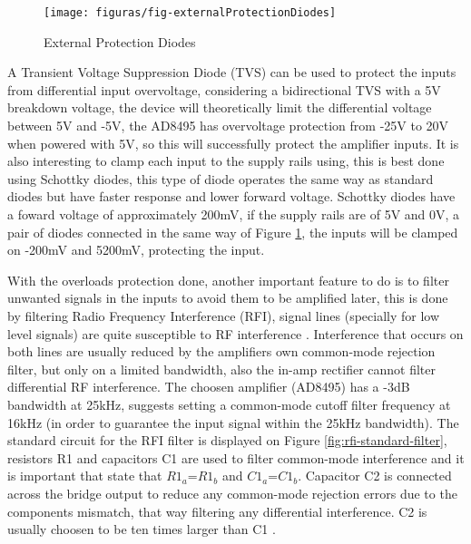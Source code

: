 		\begin{figure}[htbp]
			\centering
				\texttt{[image: figuras/fig-externalProtectionDiodes]}
			\caption{External Protection Diodes \cite{externalProtectionDiodes}}
			\label{fig:externalProtectionDiodes}
		\end{figure}
		
	A Transient Voltage Suppression Diode (TVS) can be used to protect the inputs from differential input overvoltage, considering a bidirectional TVS with a 5V breakdown voltage, the device will theoretically limit the differential voltage between 5V and -5V, the AD8495 has overvoltage protection from -25V to 20V when powered with 5V, so this will successfully protect the amplifier inputs. It is also interesting to clamp each input to the supply rails using, this is best done using Schottky diodes, this type of diode operates the same way as standard diodes but have faster response and lower forward voltage. Schottky diodes have a foward voltage of approximately 200mV, if the supply rails are of 5V and 0V, a pair of diodes connected in the same way of Figure \ref{fig:externalProtectionDiodes}, the inputs will be clamped on -200mV and 5200mV, protecting the input.
	\par
	With the overloads protection done, another important feature to do is to filter unwanted signals in the inputs to avoid them to be amplified later, this is done by filtering Radio Frequency Interference (RFI), signal lines (specially for low level signals) are quite susceptible to RF interference \cite{analogDevDesignersGuide}. Interference that occurs on both lines are usually reduced by the amplifiers own common-mode rejection filter, but only on a limited bandwidth, also the in-amp rectifier cannot filter differential RF interference. The choosen amplifier (AD8495) has a -3dB bandwidth at 25kHz, \cite{two-ways-thermocouple} suggests setting a common-mode cutoff filter frequency at 16kHz (in order to guarantee the input signal within the 25kHz bandwidth). The standard circuit for the RFI filter is displayed on Figure \ref{fig:rfi-standard-filter}, resistors R1 and capacitors C1 are used to filter common-mode interference and it is important that state that $R1_{a}$=$R1_{b}$ and $C1_{a}$=$C1_{b}$. Capacitor C2 is connected across the bridge output to reduce any common-mode rejection errors due to the components mismatch, that way filtering any differential interference. C2 is usually choosen to be ten times larger than C1 \cite{ad8495-datasheet}.
	
